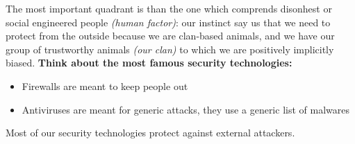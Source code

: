             The most important quadrant is than the one which comprends disonhest or social engineered people \textit{(human factor)}: our instinct say us that we need to protect from the outside because we are clan-based animals, and we have our group of trustworthy animals \textit{(our clan)} to which we are positively implicitly biased.
            \textbf{Think about the most famous security technologies:}
            \begin{itemize}
                \item Firewalls are meant to keep people out
                \item Antiviruses are meant for generic attacks, they use a generic list of malwares
            \end{itemize}
            Most of our security technologies protect against external attackers.
\newpage
